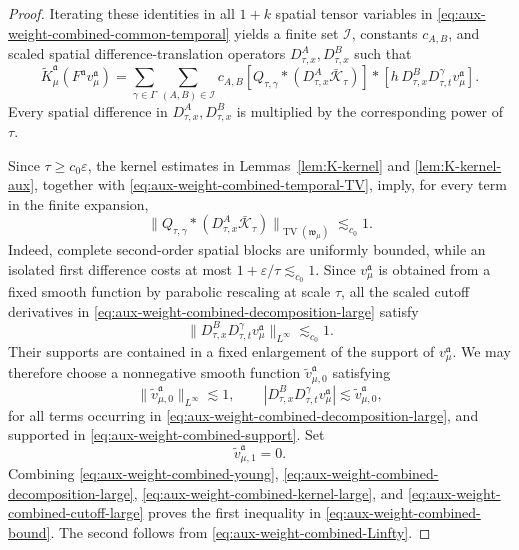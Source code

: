 \documentclass{article}
\numberwithin{equation}{section}
\theoremstyle{plain}
\theoremstyle{definition}
\begin{document}
\begin{proof}
	Iterating these identities in all $1+k$ spatial tensor variables in
	\eqref{eq:aux-weight-combined-common-temporal} yields a finite set
	$\mathcal I$, constants $c_{A,B}$, and scaled spatial
	difference-translation operators $D_{\tau,x}^A,D_{\tau,x}^B$ such that
	\begin{equation}
		\label{eq:aux-weight-combined-decomposition-large}
		\tilde K_\mu^{\mathfrak a}
		(F^{\mathfrak a}v_\mu^{\mathfrak a})
		=
		\sum_{\gamma\in\Gamma}
		\sum_{(A,B)\in\mathcal I}
		c_{A,B}
		[Q_{\tau,\gamma}*(D_{\tau,x}^A
		\bar{\mathcal K}_\tau)]*
		[h\,D_{\tau,x}^B D_{\tau,t}^{\gamma}
		v_\mu^{\mathfrak a}].
	\end{equation}
	Every spatial difference in $D_{\tau,x}^A,D_{\tau,x}^B$ is multiplied by
	the corresponding power of $\tau$.
	
	Since $\tau\geqslant c_0\varepsilon$, the kernel estimates in
	Lemmas~\ref{lem:K-kernel} and \ref{lem:K-kernel-aux}, together with
	\eqref{eq:aux-weight-combined-temporal-TV}, imply, for every term in the
	finite expansion,
	\begin{equation}
		\label{eq:aux-weight-combined-kernel-large}
		\|Q_{\tau,\gamma}*(D_{\tau,x}^A
		\bar{\mathcal K}_\tau)\|_{
		\operatorname{TV}(\mathfrak w_\mu)}
		\lesssim_{c_0}1.
	\end{equation}
	Indeed, complete second-order spatial blocks are uniformly bounded, while
	an isolated first difference costs at most
	$1+\varepsilon/\tau\lesssim_{c_0}1$. Since
	$v_\mu^{\mathfrak a}$ is obtained from a fixed smooth function by
	parabolic rescaling at scale $\tau$, all the scaled cutoff derivatives in
	\eqref{eq:aux-weight-combined-decomposition-large} satisfy
	\begin{equation}
		\label{eq:aux-weight-combined-cutoff-large}
		\|D_{\tau,x}^B D_{\tau,t}^{\gamma}
		v_\mu^{\mathfrak a}\|_{L^\infty}
		\lesssim_{c_0}1.
	\end{equation}
	Their supports are contained in a fixed enlargement of the support of
	$v_\mu^{\mathfrak a}$. We may therefore choose a nonnegative smooth
	function $\tilde v_{\mu,0}^{\mathfrak a}$ satisfying
	\[
	\|\tilde v_{\mu,0}^{\mathfrak a}\|_{L^\infty}\lesssim1,
	\qquad
	|D_{\tau,x}^B D_{\tau,t}^{\gamma}v_\mu^{\mathfrak a}|
	\lesssim\tilde v_{\mu,0}^{\mathfrak a},
	\]
	for all terms occurring in
	\eqref{eq:aux-weight-combined-decomposition-large}, and supported in
	\eqref{eq:aux-weight-combined-support}. Set
	\[
	\tilde v_{\mu,1}^{\mathfrak a}=0.
	\]
	Combining \eqref{eq:aux-weight-combined-young},
	\eqref{eq:aux-weight-combined-decomposition-large},
	\eqref{eq:aux-weight-combined-kernel-large}, and
	\eqref{eq:aux-weight-combined-cutoff-large} proves the first inequality in
	\eqref{eq:aux-weight-combined-bound}. The second follows from
	\eqref{eq:aux-weight-combined-Linfty}.
	

\end{proof}
\end{document}

